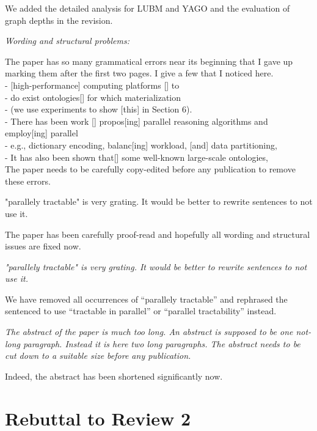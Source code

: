 \documentclass{article}
\let\quoteOld\quote
\let\endquoteOld\endquote
\renewenvironment{quote}{\quoteOld\itshape}{\endquoteOld}
\begin{document}
We added the detailed analysis for LUBM and YAGO and the evaluation of
graph depths in the revision.


\begin{quote}
Wording and structural problems:

The paper has so many grammatical errors near its beginning that I gave up
marking them after the first two pages.  I give a few that I noticed here.\\
- [high-performance] computing platforms [] to\\
- do exist ontologies[] for which materialization\\
- (we use experiments to show [this] in Section 6).\\
- There has been work [] propos[ing] parallel reasoning algorithms and employ[ing] parallel\\
- e.g., dictionary encoding, balanc[ing] workload, [and] data partitioning,\\
- It has also been shown that[] some well-known large-scale ontologies,\\
The paper needs to be carefully copy-edited before any publication to remove
these errors.

"parallely tractable" is very grating.  It would be better to rewrite
sentences to not use it.
\end{quote}

The paper has been carefully proof-read and hopefully all wording and structural issues are fixed now.

\begin{quote}
"parallely tractable" is very grating.  It would be better to rewrite
sentences to not use it.
\end{quote}

We have removed all occurrences of ``parallely tractable'' and
rephrased the sentenced to use ``tractable in parallel'' or ``parallel
tractability'' instead.

\begin{quote}
The abstract of the paper is much too long.  An abstract is supposed to be
one not-long paragraph.  Instead it is here two long paragraphs.  The
abstract needs to be cut down to a suitable size before any publication.
\end{quote}

Indeed, the abstract has been shortened significantly now.


\section{Rebuttal to Review 2}
\end{document}
